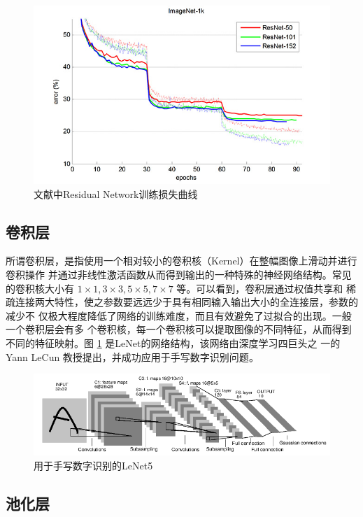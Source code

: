 \begin{figure}[ht]
  \centering
  \includegraphics[width=0.8\linewidth]{./Figure/ResNetTrainError.jpg}
  \caption{文献\cite{He:2015tt}中Residual Network训练损失曲线}
\end{figure}

\subsection{卷积层}

所谓卷积层，是指使用一个相对较小的卷积核（Kernel）在整幅图像上滑动并进行卷积操作
并通过非线性激活函数从而得到输出的一种特殊的神经网络结构。常见的卷积核大小有 $1
\times 1, 3 \times 3, 5 \times 5, 7 \times 7$ 等。可以看到，卷积层通过权值共享和
稀疏连接两大特性，使之参数要远远少于具有相同输入输出大小的全连接层，参数的减少不
仅极大程度降低了网络的训练难度，而且有效避免了过拟合的出现。一般一个卷积层会有多
个卷积核，每一个卷积核可以提取图像的不同特征，从而得到不同的特征映射。图
\ref{Fig:LeNet} 是LeNet\cite{LeCun:1990vp}的网络结构，该网络由深度学习四巨头之
一的Yann LeCun 教授提出，并成功应用于手写数字识别问题\cite{LeCun:1990vp}。

\begin{figure}[ht]
  \centering
  \includegraphics[width=0.8\linewidth]{./Figure/LeNet.png}
  \caption{用于手写数字识别的LeNet5\cite{LeCun:1990vp}} \label{Fig:LeNet}
\end{figure}

\subsection{池化层}

